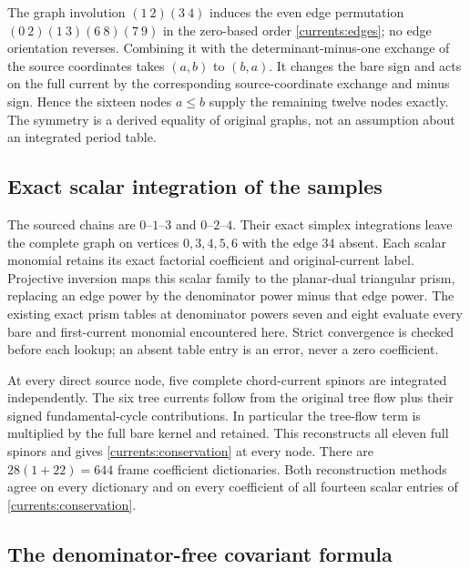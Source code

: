 The graph involution $(1\ 2)(3\ 4)$ induces the even edge permutation
$(0\ 2)(1\ 3)(6\ 8)(7\ 9)$ in the zero-based order
\eqref{currents:edges}; no edge orientation reverses. Combining it
with the determinant-minus-one exchange of the source coordinates
takes $(a,b)$ to $(b,a)$. It changes the bare sign and acts on the
full current by the corresponding source-coordinate exchange and
minus sign. Hence the sixteen nodes $a\le b$ supply the remaining
twelve nodes exactly. The symmetry is a derived equality of original
graphs, not an assumption about an integrated period table.

\subsection{Exact scalar integration of the samples}

The sourced chains are $0$--$1$--$3$ and $0$--$2$--$4$.
Their exact simplex integrations leave the complete graph on
vertices $0,3,4,5,6$ with the edge $34$ absent. Each scalar monomial
retains its exact factorial coefficient and original-current label.
Projective inversion maps this scalar family to the planar-dual
triangular prism, replacing an edge power by the denominator power
minus that edge power. The existing exact prism tables at denominator
powers seven and eight evaluate every bare and first-current
monomial encountered here. Strict convergence is checked before each
lookup; an absent table entry is an error, never a zero coefficient.

At every direct source node, five complete chord-current spinors are
integrated independently. The six tree currents follow from the
original tree flow plus their signed fundamental-cycle contributions.
In particular the tree-flow term is multiplied by the full bare
kernel and retained. This reconstructs all eleven full spinors and
gives \eqref{currents:conservation} at every node. There are
$28(1+22)=644$ frame coefficient dictionaries. Both reconstruction
methods agree on every dictionary and on every coefficient of all
fourteen scalar entries of \eqref{currents:conservation}.

\subsection{The denominator-free covariant formula}

